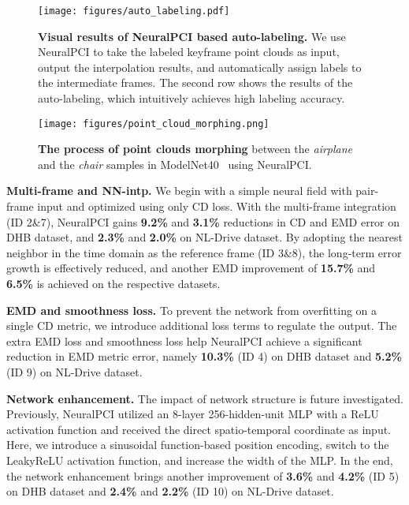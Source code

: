 \documentclass[10pt,twocolumn,letterpaper]{article}
\begin{document}
\begin{figure*}[ht]
\centering
  \texttt{[image: figures/auto\_labeling.pdf]}
  \vspace{-.2cm}
  \caption{\textbf{Visual results of NeuralPCI based auto-labeling.} We use NeuralPCI to take the labeled keyframe point clouds as input, output the interpolation results, and automatically assign labels to the intermediate frames. The second row shows the results of the auto-labeling, which intuitively achieves high labeling accuracy.}
  \label{fig:auto-label}
\vspace{-.4cm}
\end{figure*}  

\begin{figure}[ht]
\centering
  \texttt{[image: figures/point\_cloud\_morphing.png]}
  \caption{\textbf{The process of point clouds morphing} between the \textit{airplane} and the \textit{chair} samples in ModelNet40~\cite{wu20153d} using NeuralPCI.}
  \label{fig:morphing}
\vspace{-.4cm}
\end{figure}  

\textbf{Multi-frame and NN-intp.} We begin with a simple neural field with pair-frame input and optimized using only CD loss. With the multi-frame integration (ID 2\&7), NeuralPCI gains \textbf{9.2\%} and \textbf{3.1\%} reductions in CD and EMD error on DHB dataset, and \textbf{2.3\%} and \textbf{2.0\%} on NL-Drive dataset. By adopting the nearest neighbor in the time domain as the reference frame (ID 3\&8), the long-term error growth is effectively reduced, and another EMD improvement of \textbf{15.7\%} and \textbf{6.5\%} is achieved on the respective datasets. 



\textbf{EMD and smoothness loss.} To prevent the network from overfitting on a single CD metric, we introduce additional loss terms to regulate the output. The extra EMD loss and smoothness loss help NeuralPCI achieve a significant reduction in EMD metric error, namely \textbf{10.3\%} (ID 4) on DHB dataset and \textbf{5.2\%} (ID 9) on NL-Drive dataset.




\textbf{Network enhancement.} The impact of network structure is future investigated. Previously, NeuralPCI utilized an 8-layer 256-hidden-unit MLP with a ReLU activation function and received the direct spatio-temporal coordinate as input. Here, we introduce a sinusoidal function-based position encoding, switch to the LeakyReLU activation function, and increase the width of the MLP. In the end, the network enhancement brings another improvement of \textbf{3.6\%} and \textbf{4.2\%} (ID 5) on DHB dataset and \textbf{2.4\%} and \textbf{2.2\%} (ID 10) on NL-Drive dataset.
\end{document}
